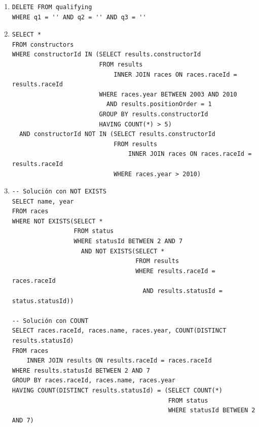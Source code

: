 \documentclass[a4paper]{article}
\begin{document}
\begin{enumerate}
    \item %
    \begin{verbatim}  
DELETE FROM qualifying
WHERE q1 = '' AND q2 = '' AND q3 = ''
    \end{verbatim}
            
    \item %
    \begin{verbatim}  
SELECT *
FROM constructors
WHERE constructorId IN (SELECT results.constructorId
						FROM results
							INNER JOIN races ON races.raceId = results.raceId
						WHERE races.year BETWEEN 2003 AND 2010
						  AND results.positionOrder = 1
						GROUP BY results.constructorId
						HAVING COUNT(*) > 5)
  AND constructorId NOT IN (SELECT results.constructorId
							FROM results
								INNER JOIN races ON races.raceId = results.raceId
							WHERE races.year > 2010)
    \end{verbatim}
        
    \item %
    \begin{verbatim}  
-- Solución con NOT EXISTS
SELECT name, year
FROM races
WHERE NOT EXISTS(SELECT *
                 FROM status
                 WHERE statusId BETWEEN 2 AND 7
                   AND NOT EXISTS(SELECT *
                                  FROM results
                                  WHERE results.raceId = races.raceId
                                    AND results.statusId = status.statusId))
                                    
-- Solución con COUNT
SELECT races.raceId, races.name, races.year, COUNT(DISTINCT results.statusId)
FROM races
	INNER JOIN results ON results.raceId = races.raceId
WHERE results.statusId BETWEEN 2 AND 7
GROUP BY races.raceId, races.name, races.year
HAVING COUNT(DISTINCT results.statusId) = (SELECT COUNT(*)
										   FROM status
                                           WHERE statusId BETWEEN 2 AND 7)
    \end{verbatim}


\end{enumerate}
\end{document}
